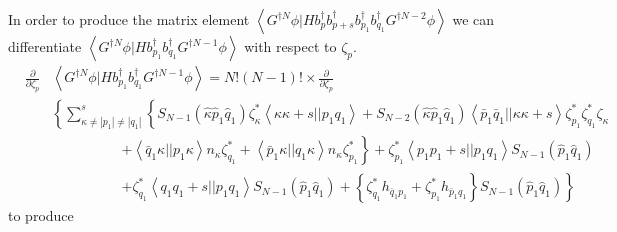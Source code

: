 In order to produce the matrix element $\left\langle G^{\dagger N}\phi
|Hb_{p}^{\dagger }b_{p+s}^{\dagger }b_{p_{1}}^{\dagger }b_{q_{1}}^{\dagger
}G^{\dagger N-2}\phi \right\rangle $ we can differentiate $\left\langle
G^{\dagger N}\phi |Hb_{p_{1}}^{\dagger }b_{q_{1}}^{\dagger }G^{\dagger
N-1}\phi \right\rangle $ with respect to $\zeta _{p}$. 
\begin{eqnarray}
&\frac{\partial }{\partial \zeta _{p}}&\left\langle G^{\dagger N}\phi
|Hb_{p_{1}}^{\dagger }b_{q_{1}}^{\dagger }G^{\dagger N-1}\phi \right\rangle
=N!\left( N-1\right) !\times \frac{\partial }{\partial \zeta _{p}}  \nonumber
\\
&&\left\{ \sum_{\kappa \neq \left| p_{1}\right| \neq \left| q_{1}\right|
}^{s}\left\{ S_{N-1}\left( \hat{\kappa}\hat{p}_{1}\hat{q}_{1}\right) \zeta
_{\kappa }^{\ast }\left\langle \kappa \kappa +s||p_{1}q_{1}\right\rangle
+S_{N-2}\left( \hat{\kappa}\hat{p}_{1}\hat{q}_{1}\right) \left\langle \bar{p}%
_{1}\bar{q}_{1}||\kappa \kappa +s\right\rangle \zeta _{p_{1}}^{\ast }\zeta
_{q_{1}}^{\ast }\zeta _{\kappa }\right. \right.  \nonumber \\
&&\quad \quad \quad \quad \quad \left. +\left\langle \bar{q}_{1}\kappa
||p_{1}\kappa \right\rangle n_{\kappa }\zeta _{q_{1}}^{\ast }+\left\langle 
\bar{p}_{1}\kappa ||q_{1}\kappa \right\rangle n_{\kappa }\zeta
_{p_{1}}^{\ast }\right\} +\zeta _{p_{1}}^{\ast }\left\langle
p_{1}p_{1}+s||p_{1}q_{1}\right\rangle S_{N-1}\left( \hat{p}_{1}\hat{q}%
_{1}\right)  \nonumber \\
&&\quad \quad \quad \quad \quad \left. +\zeta _{q_{1}}^{\ast }\left\langle
q_{1}q_{1}+s||p_{1}q_{1}\right\rangle S_{N-1}\left( \hat{p}_{1}\hat{q}%
_{1}\right) +\left\{ \zeta _{q_{1}}^{\ast }h_{\bar{q}_{1}p_{1}}+\zeta
_{p_{1}}^{\ast }h_{\bar{p}_{1}q_{1}}\right\} S_{N-1}\left( \hat{p}_{1}\hat{q}%
_{1}\right) \right\}
\end{eqnarray}%
to produce%
